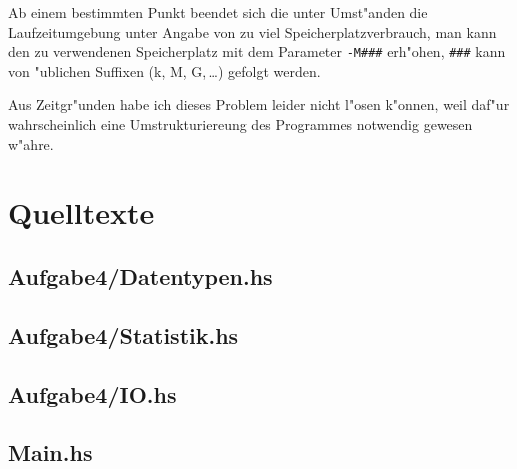 \documentclass{scrreprt}
\begin{document}
Ab einem bestimmten Punkt beendet sich die unter Umst"anden die Laufzeitumgebung
unter Angabe von zu viel Speicherplatzverbrauch, man kann den zu verwendenen
Speicherplatz mit dem Parameter \texttt{-M\#\#\#} erh"ohen, \texttt{\#\#\#} kann
von "ublichen Suffixen (k, M, G,\,\dots) gefolgt werden.

Aus Zeitgr"unden habe ich dieses Problem leider nicht l"osen k"onnen, weil
daf"ur wahrscheinlich eine Umstrukturiereung des Programmes notwendig gewesen
w"ahre. 

\chapter{Quelltexte}

\section{Aufgabe4/Datentypen.hs}


\section{Aufgabe4/Statistik.hs}


\section{Aufgabe4/IO.hs}


\section{Main.hs}

\end{document}
